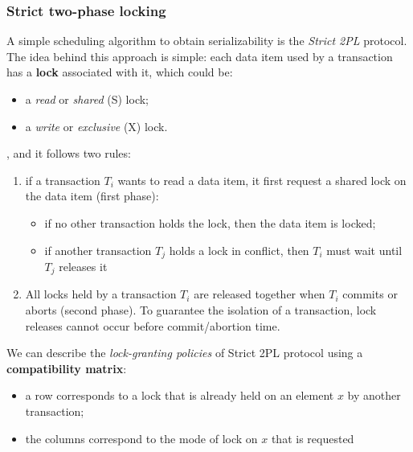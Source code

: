 \subsubsection{Strict two-phase locking}
A simple scheduling algorithm to obtain serializability is the \textit{Strict 2PL} protocol. The idea behind this approach is simple: each data item used by a transaction has a \textbf{lock} associated with it, which could be:

\begin{itemize}
    \item a \textit{read} or \textit{shared} (S) lock;
    \item a \textit{write} or \textit{exclusive} (X) lock.
\end{itemize}

, and it follows two rules:

\begin{enumerate}

    \item if a transaction $T_i$ wants to read a data item, it first request a shared lock on the data item (first phase):
    
    \begin{itemize}
    
        \item if no other transaction holds the lock, then the data item is locked;
        
        \item if another transaction $T_j$ holds a lock in conflict, then $T_i$ must wait until $T_j$ releases it
        
    \end{itemize}

    
    \item All locks held by a transaction $T_i$ are released together when $T_i$ commits or aborts (second phase). To guarantee the isolation of a transaction, lock releases cannot occur before commit/abortion time.
   
\end{enumerate}

We can describe the \textit{lock-granting policies} of Strict 2PL protocol using a \textbf{compatibility matrix}: 

\begin{itemize}

    \item a row corresponds to a lock that is already held on an element $x$ by another transaction;
    
    \item the columns correspond to the mode of lock on $x$ that is requested
    
\end{itemize}

